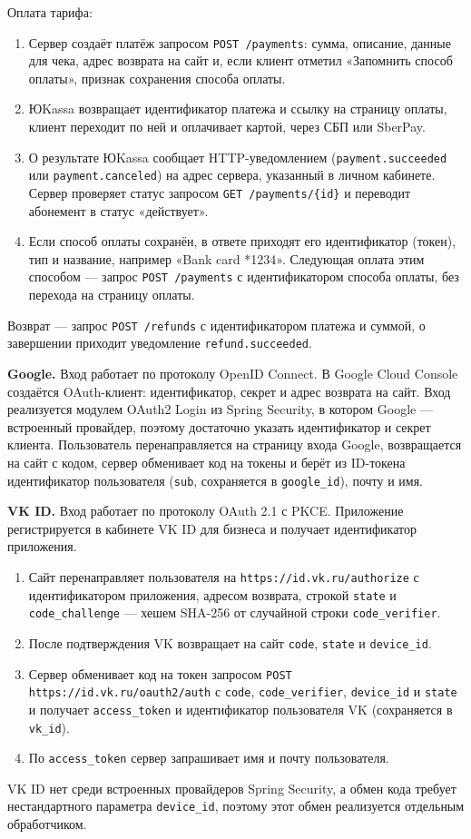 \documentclass[14pt,a4paper]{extarticle}
\begin{document}
Оплата тарифа:
\begin{enumerate}
  \item Сервер создаёт платёж запросом \texttt{POST /payments}: сумма, описание, данные для чека, адрес возврата на сайт и, если клиент отметил «Запомнить способ оплаты», признак сохранения способа оплаты.
  \item ЮKassa возвращает идентификатор платежа и ссылку на страницу оплаты, клиент переходит по ней и оплачивает картой, через СБП или SberPay.
  \item О результате ЮKassa сообщает HTTP-уведомлением (\texttt{payment.succeeded} или \texttt{payment.canceled}) на адрес сервера, указанный в личном кабинете. Сервер проверяет статус запросом \texttt{GET /payments/\{id\}} и переводит абонемент в статус «действует».
  \item Если способ оплаты сохранён, в ответе приходят его идентификатор (токен), тип и название, например «Bank card *1234». Следующая оплата этим способом --- запрос \texttt{POST /payments} с идентификатором способа оплаты, без перехода на страницу оплаты.
\end{enumerate}

Возврат --- запрос \texttt{POST /refunds} с идентификатором платежа и суммой, о завершении приходит уведомление \texttt{refund.succeeded}.

\textbf{Google.} Вход работает по протоколу OpenID Connect. В Google Cloud Console создаётся OAuth-клиент: идентификатор, секрет и адрес возврата на сайт. Вход реализуется модулем OAuth2 Login из Spring Security, в котором Google --- встроенный провайдер, поэтому достаточно указать идентификатор и секрет клиента. Пользователь перенаправляется на страницу входа Google, возвращается на сайт с кодом, сервер обменивает код на токены и берёт из ID-токена идентификатор пользователя (\texttt{sub}, сохраняется в \texttt{google\_id}), почту и имя.

\textbf{VK ID.} Вход работает по протоколу OAuth 2.1 с PKCE. Приложение регистрируется в кабинете VK ID для бизнеса и получает идентификатор приложения.
\begin{enumerate}
  \item Сайт перенаправляет пользователя на \texttt{https://id.vk.ru/authorize} с идентификатором приложения, адресом возврата, строкой \texttt{state} и \texttt{code\_challenge} --- хешем SHA-256 от случайной строки \texttt{code\_verifier}.
  \item После подтверждения VK возвращает на сайт \texttt{code}, \texttt{state} и \texttt{device\_id}.
  \item Сервер обменивает код на токен запросом \texttt{POST https://id.vk.ru/oauth2/auth} с \texttt{code}, \texttt{code\_verifier}, \texttt{device\_id} и \texttt{state} и получает \texttt{access\_token} и идентификатор пользователя VK (сохраняется в \texttt{vk\_id}).
  \item По \texttt{access\_token} сервер запрашивает имя и почту пользователя.
\end{enumerate}
VK ID нет среди встроенных провайдеров Spring Security, а обмен кода требует нестандартного параметра \texttt{device\_id}, поэтому этот обмен реализуется отдельным обработчиком.
\end{document}
